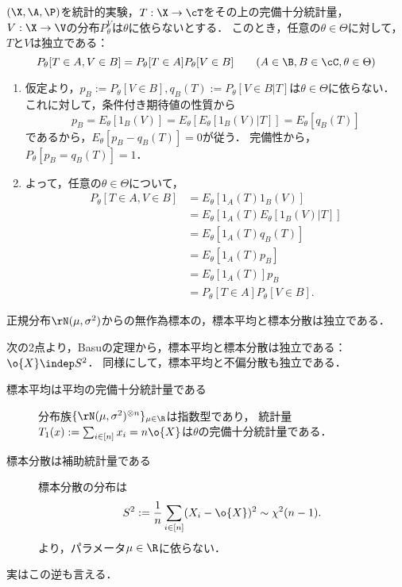 \documentclass[uplatex,dvipdfmx]{jsarticle}
\begin{document}
\begin{theorem}
    $(\X,\A,\P)$を統計的実験，$T:\X\to\cT$をその上の完備十分統計量，$V:\X\to\V$の分布$P^V_\theta$は$\theta$に依らないとする．
    このとき，任意の$\theta\in\Theta$に対して，$T$と$V$は独立である：
    \[P_\theta[T\in A,V\in B]=P_\theta[T\in A]P_\theta[V\in B]\qquad(A\in\B,B\in\cC,\theta\in\Theta)\]
\end{theorem}
\begin{Proof}\mbox{}
    \begin{enumerate}[{Step}1]
        \item 仮定より，$p_B:=P_\theta[V\in B],q_B(T):=P_\theta[V\in B|T]$は$\theta\in\Theta$に依らない．
        これに対して，条件付き期待値の性質から
        \[p_B=E_\theta[1_B(V)]=E_\theta[E_\theta[1_B(V)|T]]=E_\theta[q_B(T)]\]
        であるから，$E_\theta[p_B-q_B(T)]=0$が従う．
        完備性から，$P_\theta[p_B=q_B(T)]=1$．
        \item よって，任意の$\theta\in\Theta$について，
        \begin{align*}
            P_\theta[T\in A,V\in B]&=E_\theta[1_A(T)1_B(V)]\\
            &=E_\theta[1_A(T)E_\theta[1_B(V)|T]]\\
            &=E_\theta[1_A(T)q_B(T)]\\
            &=E_\theta[1_A(T)p_B]\\
            &=E_\theta[1_A(T)]p_B\\
            &=P_\theta[T\in A]P_\theta[V\in B].
        \end{align*}
    \end{enumerate}
\end{Proof}

\begin{corollary}\label{cor-Basu}
    正規分布$\rN(\mu,\sigma^2)$からの無作為標本の，標本平均と標本分散は独立である．
\end{corollary}
\begin{Proof}
    次の2点より，Basuの定理から，標本平均と標本分散は独立である：$\o{X}\indep S^2$．
    同様にして，標本平均と不偏分散も独立である．
    \begin{description}
        \item[標本平均は平均の完備十分統計量である] 
        分布族$\{\rN(\mu,\sigma^2)^{\otimes n}\}_{\mu\in\R}$は指数型であり，
        統計量$T_1(x):=\sum_{i\in[n]}x_i=n\o{X}$は$\theta$の完備十分統計量である．
        \item[標本分散は補助統計量である] 標本分散の分布は
        \[S^2:=\frac{1}{n}\sum_{i\in[n]}(X_i-\o{X})^2\sim\chi^2(n-1).\]
        より，パラメータ$\mu\in\R$に依らない．
    \end{description}
\end{Proof}
\begin{remark}
    実はこの逆も言える\cite{Kawata-Sakamoto49}．
\end{remark}
\end{document}
